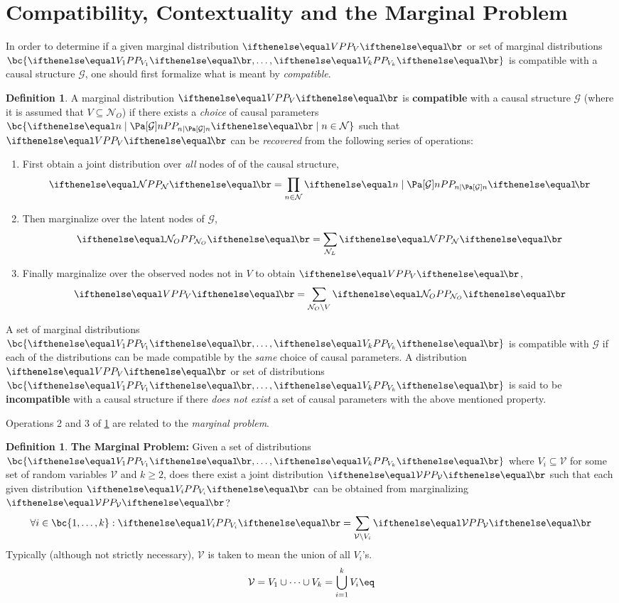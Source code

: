 \documentclass[aps, 10pt, english, twoside, pra, nofootinbib, longbibliography]{revtex4-1}
\theoremstyle{plain}
\theoremstyle{definition}
\newtheorem{definition}[theorem]{Definition}
\theoremstyle{remark}
\newcommand{\graph}{\mathcal{G}}
\newcommand{\nodes}{\mathcal{N}}
\newcommand{\term}[1]{\textcolor{Mahogany}{\textbf{#1}}}
\begin{document}
    \section{Compatibility, Contextuality and the Marginal Problem}
    In order to determine if a given marginal distribution $\prob[V]$ or set of marginal distributions $\bc{\prob[V_1], \ldots, \prob[V_k]}$ is compatible with a causal structure $\graph$, one should first formalize what is meant by \textit{compatible}.
    \begin{definition}
        \label{def:compatible}
        A marginal distribution $\prob[V]$ is \term{compatible} with a causal structure $\graph$ (where it is assumed that $V \subseteq \nodes_O$) if there exists a \textit{choice} of causal parameters $\bc{\prob[n \mid \Pa[\graph]{n}] \mid n \in \nodes}$ such that $\prob[V]$ can be \textit{recovered} from the following series of operations:

        \begin{enumerate}
            \item First obtain a joint distribution over \textit{all} nodes of of the causal structure,
            \[ \prob[\nodes] = \prod_{n \in \nodes} \prob[n \mid \Pa[\graph]{n}] \]
            \item Then marginalize over the latent nodes of $\graph$,
            \[ \prob[\nodes_O] = \sum_{\nodes_L} \prob[\nodes] \]
            \item Finally marginalize over the observed nodes not in $V$ to obtain $\prob[V]$,
            \[ \prob[V] = \sum_{\nodes_O \setminus V} \prob[\nodes_O] \]
        \end{enumerate}
        A set of marginal distributions $\bc{\prob[V_1], \ldots, \prob[V_k]}$ is compatible with $\graph$ if each of the distributions can be made compatible by the \textit{same} choice of causal parameters.
        A distribution $\prob[V]$ or set of distributions $\bc{\prob[V_1], \ldots, \prob[V_k]}$ is said to be \term{incompatible} with a causal structure if there \textit{does not exist} a set of causal parameters with the above mentioned property.

    \end{definition}

    Operations 2 and 3 of \cref{def:compatible} are related to the \textit{marginal problem}.
    \begin{definition}
        \label{def:marginal_problem}
        \term{The Marginal Problem:} Given a set of distributions $\bc{\prob[V_1], \ldots, \prob[V_k]}$ where $V_i \subseteq \mathcal{V}$ for some set of random variables $\mathcal{V}$ and $k \geq 2$, does there exist a joint distribution $\prob[\mathcal{V}]$ such that each given distribution $\prob[V_i]$ can be obtained from marginalizing $\prob[\mathcal{V}]$?
        \[ \forall i \in \bc{1, \ldots, k} : \prob[V_i] = \sum_{\mathcal{V} \setminus V_i} \prob[\mathcal{V}] \]
        Typically (although not strictly necessary), $\mathcal{V}$ is taken to mean the union of all $V_i$'s.
        \[ \mathcal{V} = V_1 \cup \cdots \cup V_k = \bigcup_{i=1}^{k} V_i \eq \label{eq:marginals_union} \]
    \end{definition}
\end{document}
